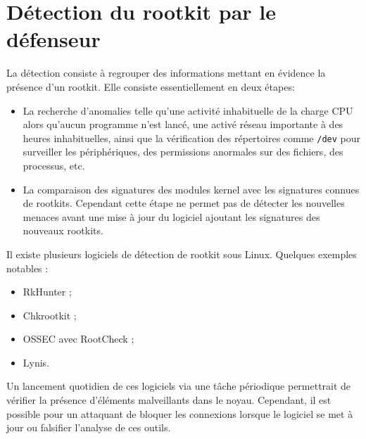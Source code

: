 \documentclass[12pt]{article}
\begin{document}
\section{Détection du rootkit par le défenseur}
    
    La détection consiste à regrouper des informations mettant en évidence la présence d'un rootkit. Elle consiste essentiellement en deux étapes\cite{detection}:
    \begin{itemize}
    	\item La recherche d'anomalies telle qu'une activité inhabituelle de la charge CPU alors qu'aucun programme n'est lancé, une activé réseau importante à des heures inhabituelles, ainsi que la vérification des répertoires comme \texttt{/dev} pour surveiller les périphériques, des permissions anormales sur des fichiers, des processus, etc.
    	\item La comparaison des signatures des modules kernel avec les signatures connues de rootkits. Cependant cette étape ne permet pas de détecter les nouvelles menaces avant une mise à jour du logiciel ajoutant les signatures des nouveaux rootkits.
    \end{itemize}
    
    Il existe plusieurs logiciels de détection de rootkit sous Linux. Quelques exemples notables :
    \begin{itemize}
    	\item RkHunter\cite{rkhunter} ;
    	\item Chkrootkit\cite{chrootkit} ;
    	\item OSSEC avec RootCheck\cite{rootcheck} ;
    	\item Lynis\cite{lynis}.
    \end{itemize}
    
    Un lancement quotidien de ces logiciels via une tâche périodique permettrait de vérifier la présence d'éléments malveillants dans le noyau. Cependant, il est possible pour un attaquant de bloquer les connexions lorsque le logiciel se met à jour ou falsifier l'analyse de ces outils.
    
    
\end{document}
